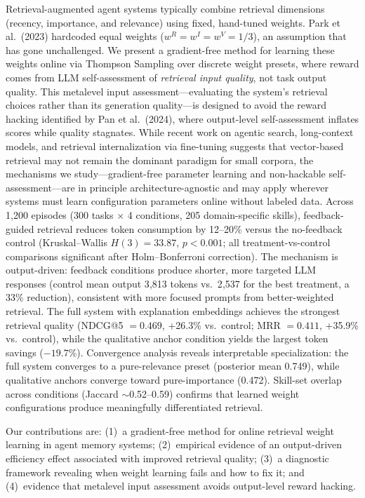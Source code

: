
Retrieval-augmented agent systems typically combine retrieval dimensions (recency, importance, and relevance) using fixed, hand-tuned weights.
Park et al.\ (2023) hardcoded equal weights ($w^R = w^I = w^V = 1/3$), an assumption that has gone unchallenged.
We present a gradient-free method for learning these weights online via Thompson Sampling over discrete weight presets, where reward comes from LLM self-assessment of \emph{retrieval input quality}, not task output quality.
This metalevel input assessment---evaluating the system's retrieval choices rather than its generation quality---is designed to avoid the reward hacking identified by Pan et al.\ (2024), where output-level self-assessment inflates scores while quality stagnates.
While recent work on agentic search, long-context models, and retrieval internalization via fine-tuning suggests that vector-based retrieval may not remain the dominant paradigm for small corpora, the mechanisms we study---gradient-free parameter learning and non-hackable self-assessment---are in principle architecture-agnostic and may apply wherever systems must learn configuration parameters online without labeled data.
Across 1{,}200 episodes (300 tasks $\times$ 4 conditions, 205 domain-specific skills), feedback-guided retrieval reduces token consumption by 12--20\% versus the no-feedback control (Kruskal--Wallis $H(3){=}33.87$, $p{<}0.001$; all treatment-vs-control comparisons significant after Holm--Bonferroni correction).
The mechanism is output-driven: feedback conditions produce shorter, more targeted LLM responses (control mean output 3{,}813 tokens vs.\ 2{,}537 for the best treatment, a 33\% reduction), consistent with more focused prompts from better-weighted retrieval.
The full system with explanation embeddings achieves the strongest retrieval quality (NDCG@5 $= 0.469$, +26.3\% vs.\ control; MRR $= 0.411$, +35.9\% vs.\ control), while the qualitative anchor condition yields the largest token savings ($-19.7\%$).
Convergence analysis reveals interpretable specialization: the full system converges to a pure-relevance preset (posterior mean 0.749), while qualitative anchors converge toward pure-importance (0.472).
Skill-set overlap across conditions (Jaccard ${\sim}$0.52--0.59) confirms that learned weight configurations produce meaningfully differentiated retrieval.

Our contributions are: (1)~a gradient-free method for online retrieval weight learning in agent memory systems; (2)~empirical evidence of an output-driven efficiency effect associated with improved retrieval quality; (3)~a diagnostic framework revealing when weight learning fails and how to fix it; and (4)~evidence that metalevel input assessment avoids output-level reward hacking.
